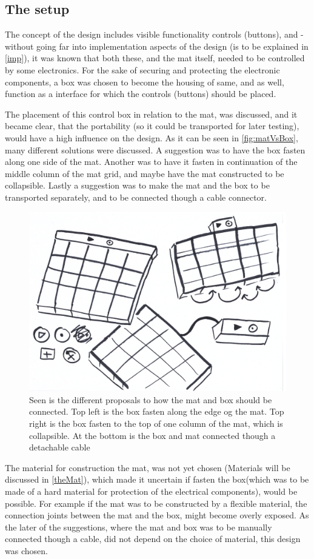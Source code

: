 \subsection{The setup}
The concept of the design includes visible functionality controls (buttons), and - without going far into implementation aspects of the design (is to be explained in \autoref{imp}), it was known that both these, and the mat itself, needed to be controlled by some electronics. For the sake of securing and protecting the electronic components, a box was chosen to become the housing of same, and as well, function as a interface for which the controls (buttons) should be placed. 

The placement of this control box in relation to the mat, was discussed, and it became clear, that the portability (so it could be transported for later testing), would have a high influence on the design. As it can be seen in \autoref{fig:matVsBox}, many different solutions were discussed. A suggestion was to have the box fasten along one side of the mat. Another was to have it fasten in continuation of the middle column of the mat grid, and maybe have the mat constructed to be collapsible. Lastly a suggestion was to make the mat and the box to be transported separately, and to be connected though a cable connector.     

\begin{figure}[H]
	\centering
	\includegraphics[width=0.7\linewidth]{figure/Design/maatteSetup}
	\caption{Seen is the different proposals to how the mat and box should be connected. Top left is the box fasten along the edge og the mat. Top right is the box fasten to the top of one column of the mat, which is collapsible. At the bottom is the box and mat connected though a detachable cable}
	\label{fig:matVsBox}
\end{figure} 

The material for construction the mat, was not yet chosen (Materials will be discussed in \autoref{theMat}), which made it uncertain if fasten the box(which was to be made of a hard material for protection of the electrical components), would be possible. For example if the mat was to be constructed by a flexible material, the connection joints between the mat and the box, might become overly exposed.
As the later of the suggestions, where the mat and box was to be manually connected though a cable, did not depend on the choice of material, this design was chosen. 


